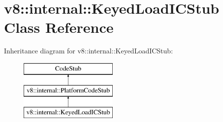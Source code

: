\hypertarget{classv8_1_1internal_1_1_keyed_load_i_c_stub}{}\section{v8\+:\+:internal\+:\+:Keyed\+Load\+I\+C\+Stub Class Reference}
\label{classv8_1_1internal_1_1_keyed_load_i_c_stub}
Inheritance diagram for v8\+:\+:internal\+:\+:Keyed\+Load\+I\+C\+Stub\+:\begin{figure}[H]
\begin{center}
\leavevmode
\includegraphics[height=3.000000cm]{classv8_1_1internal_1_1_keyed_load_i_c_stub}
\end{center}
\end{figure}
